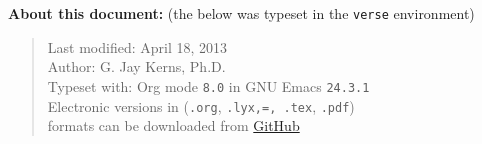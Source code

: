 \documentclass[11pt]{article}
\begin{document}
\bigskip

\textbf{About this document:} (the below was typeset in the \texttt{verse}
environment)

\begin{verse}
Last modified: April 18, 2013 \\
Author: G. Jay Kerns, Ph.D. \\
Typeset with: Org mode \texttt{8.0} in GNU Emacs \texttt{24.3.1} \\
Electronic versions in (\texttt{.org}, \texttt{.lyx,=, .tex}, \texttt{.pdf}) \\
formats can be downloaded from \href{https://github.com/gjkerns/gradproject}{GitHub} \\
\end{verse}
\end{document}
